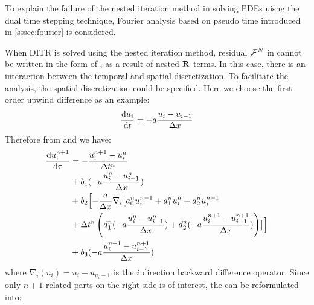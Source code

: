 \documentclass[preprint,12pt]{elsarticle}
\begin{document}
To explain the failure of the nested iteration method
in solving PDEs uisng the dual time stepping technique, Fourier
analysis based on pseudo time introduced in \ref{sssec:fourier} is considered.

When DITR is solved using the nested iteration method,
residual $\mathcal{F}^N$ in 
cannot be written in the form of  ,
as a result of nested $\mathbf{R}$ terms.
In this case, there is an interaction
between the temporal and spatial discretization.
To facilitate the analysis, the spatial discretization 
could be specified.
Here we choose the first-order
upwind difference as an example:
\begin{equation}
    \derivative{u_i}{t} = -a \frac{u_i - u_{i-1}}{\inc x}
    \label{eq:fdup1}
\end{equation}
Therefore from  and  we have:
\begin{equation}
    \begin{aligned}
        \frac{\dd u_i^{n+1}}{\dd \tau} & =
        -\frac{u_i^{n+1} - u_i^{n}}{\mathrm\Delta t^n}      \\
                                       & +
        b_1 (-a\frac{u_i^{n}-u_{i-1}^{n}}{\mathrm\Delta x}) \\
                                       & +
        b_2 \Bigl[-\frac{a}{\mathrm\Delta x} \nabla_i
        \bigl[
        a^n_0u^{n - 1}_i +
        a^n_1u^{n}_i +
        a^n_2u^{n + 1}_i                           \\
                                       & +
        \mathrm\Delta t^n
        \left(
        d^n_1(-a\frac{u_i^{n}-u_{i-1}^{n}}{\mathrm\Delta x}) +
        d^n_2(-a\frac{u_i^{n+1}-u_{i-1}^{n+1}}{\mathrm\Delta x})
        \right)\bigr]  \Bigr]                      \\
                                       & +
        b_3 (-a\frac{u_i^{n+1}-u_{i-1}^{n+1}}{\mathrm\Delta x})
        \label{eq:nestedDITR_F1}
    \end{aligned}
\end{equation}
where $\nabla_i(u_i) = u_i - u_{u_i-1}$ is the $i$ direction
backward difference operator.
Since only $n+1$ related parts on
the right side is of interest, 
the  can be reformulated into:
\end{document}
